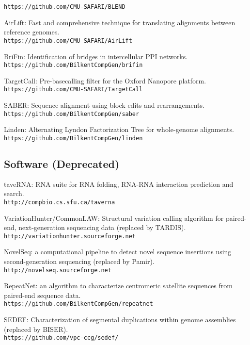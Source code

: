 \begin{list2}
{\tt https://github.com/CMU-SAFARI/BLEND}
  \item
AirLift: Fast and comprehensive technique for translating alignments between reference genomes.\\
{\tt https://github.com/CMU-SAFARI/AirLift}
\item 
BriFin: Identification of bridges in intercellular PPI networks.
{\tt https://github.com/BilkentCompGen/brifin}
\item 
TargetCall: Pre-basecalling filter for the Oxford Nanopore platform.\\
{\tt https://github.com/CMU-SAFARI/TargetCall}
\item 
SABER: Sequence alignment using block edits and rearrangements.\\
{\tt https://github.com/BilkentCompGen/saber}
\item 
Linden: Alternating Lyndon Factorization Tree for whole-genome alignments.\\
{\tt https://github.com/BilkentCompGen/linden}
\end{list2}

\subsection{\small \sc Software (Deprecated)}
\begin{list2}
\item
  taveRNA: RNA suite for RNA folding, RNA-RNA interaction prediction and search. \\
  {\tt http://compbio.cs.sfu.ca/taverna}
\item
  VariationHunter/CommonLAW: Structural variation calling algorithm for paired-end, next-generation sequencing data (replaced by TARDIS).
  {\tt http://variationhunter.sourceforge.net}
\item
  NovelSeq: a computational pipeline to detect novel sequence insertions using second-generation sequencing (replaced by Pamir).
  {\tt http://novelseq.sourceforge.net}
\item
  RepeatNet: an algorithm to characterize centromeric satellite sequences from paired-end sequence data.\\
  {\tt https://github.com/BilkentCompGen/repeatnet}
  \item
  SEDEF: Characterization of segmental duplications within genome assemblies (replaced by BISER).\\
  {\tt https://github.com/vpc-ccg/sedef/}
\end{list2}






